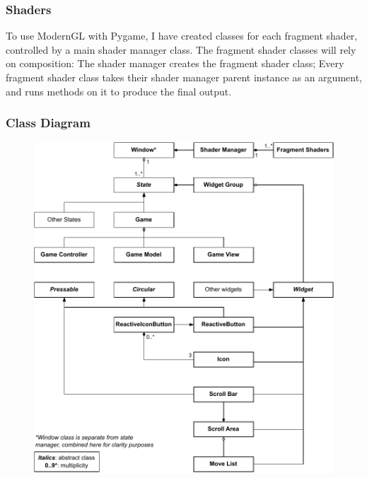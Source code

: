 \documentclass[../main/main.tex]{subfiles}
\begin{document}
\subsubsection*{Shaders}
To use ModernGL with Pygame, I have created classes for each fragment shader, controlled by a main shader manager class. The fragment shader classes will rely on composition: The shader manager creates the fragment shader class; Every fragment shader class takes their shader manager parent instance as an argument, and runs methods on it to produce the final output.

\subsubsection{Class Diagram}
\begin{figure}[H]
    \centering
    \includegraphics[width=\columnwidth]{../design/assets/class_relation_diagram.pdf}
    \label{fig:class-relation-diagram}
\end{figure}
\end{document}

